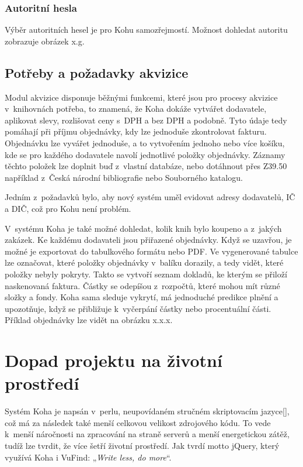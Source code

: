 \documentclass[
	11pt, oneside, printed, draft, 
	table,   %
	lof,     %
	lot     %
]{fithesis3}
\makeatletter
\newcommand{\citepages}[2]{[\cite[#1]{#2}]}
\newcommand{\citace}[1]{„\textit{#1}“} %
\makeatother
\begin{document}
{\subsubsection{Autoritní hesla}
Výběr autoritních hesel je pro Kohu samozřejmostí. Možnost dohledat autoritu zobrazuje obrázek x.g.


\subsection{Potřeby a požadavky akvizice}
Modul akvizice disponuje běžnými funkcemi, které jsou pro procesy akvizice v~knihovnách potřeba, to znamená, že Koha dokáže vytvářet dodavatele, aplikovat slevy, rozlišovat ceny s~DPH a bez DPH a podobně. Tyto údaje tedy pomáhají při příjmu objednávky, kdy lze jednoduše zkontrolovat fakturu. Objednávku lze vyvářet jednoduše, a to vytvořením jednoho nebo více košíku, kde se pro každého dodavatele navolí jednotlivé položky objednávky. Záznamy těchto položek lze doplnit buď z~vlastní databáze, nebo dotáhnout přes Z39.50 například z~Česká národní bibliografie nebo Souborného katalogu.

Jedním z~požadavků bylo, aby nový systém uměl evidovat adresy dodavatelů, IČ a DIČ, což pro Kohu není problém.

V~systému Koha je také možné dohledat, kolik knih bylo koupeno a z~jakých zakázek. Ke každému dodavateli jsou přiřazené objednávky. Když se uzavřou, je možné je exportovat do tabulkového formátu nebo PDF. Ve vygenerované tabulce lze označovat, které položky objednávky v~balíku dorazily, a tedy vidět, které položky nebyly pokryty. Takto se vytvoří seznam dokladů, ke kterým se přiloží naskenovaná faktura. Částky se odepíšou z~rozpočtů, které mohou mít různé složky a fondy. Koha sama sleduje vykrytí, má jednoduché predikce plnění a upozotňuje, když se přibližuje k~vyčerpání částky nebo procentuální části. Příklad objednávky lze vidět na obrázku x.x.x.


\section{Dopad projektu na životní prostředí}
Systém Koha je napsán v~perlu, neupovídaném stručném skriptovacím jazyce\citepages{v-ix}{Wall1997}, což má za následek také menší celkovou velikost zdrojového kódu. To vede k~menší náročnosti na zpracování na straně serverů a menší energetickou zátěž, tudíž lze tvrdit, že více šetří životní prostředí. Jak tvrdí motto jQuery, který využívá Koha i VuFind: \citace{Write less, do more}. %

}
\end{document}
